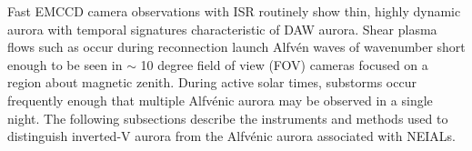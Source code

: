 \graphicspath{{Fusion/}}
Fast EMCCD camera observations with ISR routinely show thin, highly dynamic aurora with temporal signatures characteristic of DAW aurora.
Shear plasma flows such as occur during reconnection launch Alfvén waves of wavenumber short enough to be seen in $\sim$ 10 degree field of view (FOV) cameras focused on a region about magnetic zenith.
During active solar times, substorms occur frequently enough that multiple Alfvénic aurora may be observed in a single night.
The following subsections describe the instruments and methods used to distinguish inverted-V aurora from the Alfvénic aurora associated with NEIALs.





